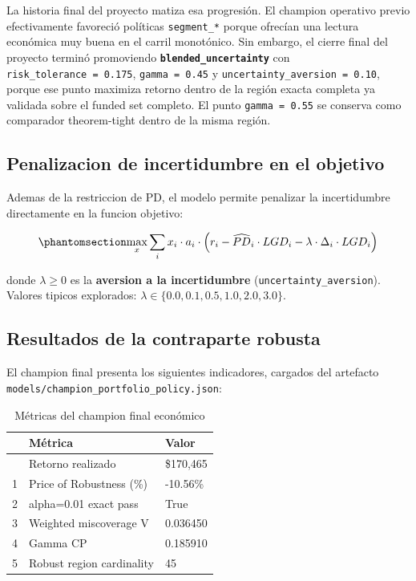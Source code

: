 \documentclass[
  spanish,
  11pt,
  letterpaper,
]{scrbook}
\theoremstyle{plain}
\theoremstyle{remark}
\begin{document}
La historia final del proyecto matiza esa progresión. El champion
operativo previo efectivamente favoreció políticas \texttt{segment\_*}
porque ofrecían una lectura económica muy buena en el carril monotónico.
Sin embargo, el cierre final del proyecto terminó promoviendo
\textbf{\texttt{blended\_uncertainty}} con
\texttt{risk\_tolerance\ =\ 0.175}, \texttt{gamma\ =\ 0.45} y
\texttt{uncertainty\_aversion\ =\ 0.10}, porque ese punto maximiza
retorno dentro de la región exacta completa ya validada sobre el funded
set completo. El punto \texttt{gamma\ =\ 0.55} se conserva como
comparador theorem-tight dentro de la misma región.

\subsection{Penalizacion de incertidumbre en el
objetivo}\label{penalizacion-de-incertidumbre-en-el-objetivo}

Ademas de la restriccion de PD, el modelo permite penalizar la
incertidumbre directamente en la funcion objetivo:

\begin{equation}\protect\phantomsection\label{eq-robust-objective}{
\max_{x} \sum_{i} x_i \cdot a_i \cdot \left( r_i - \widehat{PD}_i \cdot LGD_i - \lambda \cdot \Delta_i \cdot LGD_i \right)
}\end{equation}

donde \(\lambda \geq 0\) es la \textbf{aversion a la incertidumbre}
(\texttt{uncertainty\_aversion}). Valores tipicos explorados:
\(\lambda \in \{0.0, 0.1, 0.5, 1.0, 2.0, 3.0\}\).

\subsection{Resultados de la contraparte
robusta}\label{resultados-de-la-contraparte-robusta}

El champion final presenta los siguientes indicadores, cargados del
artefacto \texttt{models/champion\_portfolio\_policy.json}:

{

\begin{longtable}[]{@{}lll@{}}

\caption{\label{tbl-robust-metrics}Métricas del champion final
económico}

\tabularnewline

\toprule\noalign{}
& Métrica & Valor \\
\midrule\noalign{}
\endhead
\bottomrule\noalign{}
\endlastfoot
0 & Retorno realizado & \$170,465 \\
1 & Price of Robustness (\%) & -10.56\% \\
2 & alpha=0.01 exact pass & True \\
3 & Weighted miscoverage V & 0.036450 \\
4 & Gamma CP & 0.185910 \\
5 & Robust region cardinality & 45 \\

\end{longtable}

}
\end{document}
